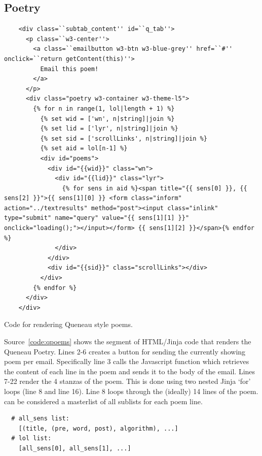 \subsection{Poetry}
\label{s:poetry}

\begin{listing}[h!]
  \begin{verbatim}
    <div class=``subtab_content'' id=``q_tab''>
      <p class=``w3-center''>
        <a class=``emailbutton w3-btn w3-blue-grey'' href=``#'' onclick=``return getContent(this)''>
          Email this poem!
        </a>
      </p>
      <div class="poetry w3-container w3-theme-l5">
        {% for n in range(1, lol|length + 1) %}
          {% set wid = ['wn', n|string]|join %}
          {% set lid = ['lyr', n|string]|join %}
          {% set sid = ['scrollLinks', n|string]|join %}
          {% set aid = lol[n-1] %}
          <div id="poems">
            <div id="{{wid}}" class="wn">
              <div id="{{lid}}" class="lyr">
                {% for sens in aid %}<span title="{{ sens[0] }}, {{ sens[2] }}">{{ sens[1][0] }} <form class="inform" action="../textresults" method="post"><input class="inlink" type="submit" name="query" value="{{ sens[1][1] }}" onclick="loading();"></input></form> {{ sens[1][2] }}</span>{% endfor %}
              </div>
            </div>
            <div id="{{sid}}" class="scrollLinks"></div>
          </div>
        {% endfor %}
      </div>
    </div>
  \end{verbatim}
\caption{Code for rendering Queneau style poems.}
\label{code:qpoems}
\end{listing}

Source~\ref{code:qpoems} shows the segment of HTML/Jinja code that renders the Queneau Poetry. Lines 2-6 creates a button for sending the currently showing poem per email. Specifically line \num{3} calls the Javascript function  which retrieves the content of each line in the poem and sends it to the body of the email. Lines \num{7}-\num{22} render the \num{4} stanzas of the poem. This is done using two nested Jinja `for' loops (line \num{8} and line \num{16}). Line \num{8} loops through the (ideally) \num{14} lines of the poem.  can be considered a masterlist of all sublists for each poem line.


\begin{verbatim}
  # all_sens list:
    [(title, (pre, word, post), algorithm), ...]
  # lol list:
    [all_sens[0], all_sens[1], ...]
\end{verbatim}


